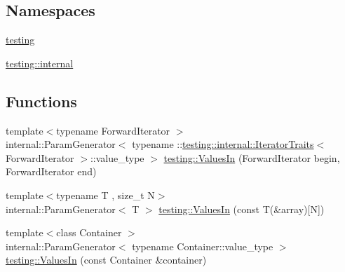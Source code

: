 \subsection*{Namespaces}
\begin{DoxyCompactItemize}
\item 
 \mbox{\hyperlink{namespacetesting}{testing}}
\item 
 \mbox{\hyperlink{namespacetesting_1_1internal}{testing\+::internal}}
\end{DoxyCompactItemize}
\subsection*{Functions}
\begin{DoxyCompactItemize}
\item 
{\footnotesize template$<$typename Forward\+Iterator $>$ }\\internal\+::\+Param\+Generator$<$ typename \+::\mbox{\hyperlink{structtesting_1_1internal_1_1IteratorTraits}{testing\+::internal\+::\+Iterator\+Traits}}$<$ Forward\+Iterator $>$\+::value\+\_\+type $>$ \mbox{\hyperlink{namespacetesting_a96240380ae4d3b4855d07de3b84fb336}{testing\+::\+Values\+In}} (Forward\+Iterator begin, Forward\+Iterator end)
\item 
{\footnotesize template$<$typename T , size\+\_\+t N$>$ }\\internal\+::\+Param\+Generator$<$ T $>$ \mbox{\hyperlink{namespacetesting_affa90ba3821bd7ac15f147b1c31f9a73}{testing\+::\+Values\+In}} (const T(\&array)\mbox{[}N\mbox{]})
\item 
{\footnotesize template$<$class Container $>$ }\\internal\+::\+Param\+Generator$<$ typename Container\+::value\+\_\+type $>$ \mbox{\hyperlink{namespacetesting_aa67d0c8470c5f69fcfcacc9e775fa982}{testing\+::\+Values\+In}} (const Container \&container)
\end{DoxyCompactItemize}
